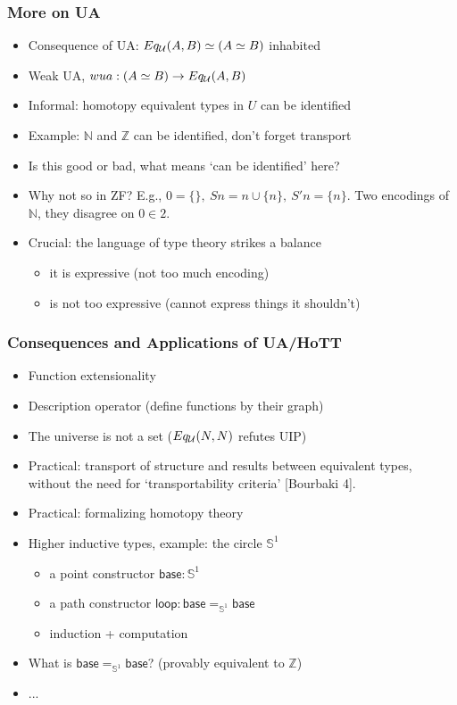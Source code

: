 \documentclass[handout]{beamer}
\newcommand{\Nat}{\mathbb{N}}
\newcommand{\Int}{\mathbb{Z}}
\newcommand{\set}[1]{\{#1\}}
\newcommand{\UU}{{\cal U}}
\newcommand{\Sn}{\mathbb{S}}
\newcommand{\base}{\mathsf{base}}
\newcommand{\lloop}{\mathsf{loop}}
\begin{document}
\begin{frame}
\frametitle{More on UA}
  \begin{itemize}[<+->]
    \item Consequence of UA: $Eq_{\UU}(A,B) \simeq (A\simeq B)$ inhabited
    \item Weak UA, $wua : (A\simeq B) \to Eq_{\UU}(A,B)$
    \item Informal: homotopy equivalent types in $U$ can be identified
    \item Example: $\Nat$ and $\Int$ can be identified, don't forget transport
    \item Is this good or bad, what means `can be identified' here?
    \item Why not so in ZF? E.g., $0=\set{},~Sn = n \cup \set{n},~S'n=\set{n}$.
    Two encodings of $\Nat$, they disagree on $0\in 2$.
    \item Crucial: the language of type theory strikes a balance
      \begin{itemize}[<+->]
      \item it is expressive (not too much encoding)
      \item is not too expressive (cannot express things it shouldn't)
      \end{itemize}
  \end{itemize}
\end{frame}


 \frame
  {

    \frametitle{Consequences and Applications of UA/HoTT}

    \begin{itemize}[<+->]
    \item Function extensionality
    \item Description operator (define functions by their graph)
    \item The universe is not a set ($Eq_\UU(N,N)$ refutes UIP)
     \item Practical: transport of structure and results between equivalent types,
    without the need for `transportability criteria' [Bourbaki 4].
    \href{https://en.wikipedia.org/wiki/Equivalent_definitions_of_mathematical_structures}%
    {\color{red}{wiki/Equivalent\_definitions\_of\_mathematical\_structures}}
   \item Practical: formalizing homotopy theory \color{red}{synthetically}
    \item Higher inductive types, example: the circle $\Sn^1$
\begin{itemize}
\item a point constructor $\base :\Sn^1$
\item a path constructor $\lloop : {\base =_{\Sn^1} \base}$
\item induction + computation
\end{itemize}
    \item What is  $\base =_{\Sn^1} \base$? (provably equivalent to $\Int$)
    \item ...

    \end{itemize}
  }
\end{document}
